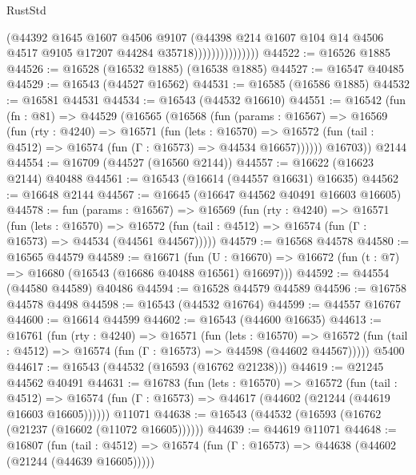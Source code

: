 \begin{lexlean}{RustStd}
\begin{coremodule}
                              (@44392
                                @1645
                                @1607
                                @4506
                                @9107
                                (@44398
                                  @214
                                  @1607
                                  @104
                                  @14
                                  @4506
                                  @4517
                                  @9105
                                  @17207
                                  @44284
                                  @35718)))))))))))))))
@44522 := @16526 @1885
@44526 := @16528 (@16532 @1885) (@16538 @1885)
@44527 := @16547 @40485
@44529 := @16543 (@44527 @16562)
@44531 := @16585 (@16586 @1885)
@44532 := @16581 @44531
@44534 := @16543 (@44532 @16610)
@44551 := @16542
    (fun (fn : @81) =>
    @44529
      (@16565
        (@16568
          (fun (params : @16567) =>
          @16569
            (fun (rty : @4240) =>
            @16571
              (fun (lets : @16570) =>
              @16572 (fun (tail : @4512) => @16574 (fun (Γ : @16573) => @44534 @16657))))))
        @16703))
    @2144
@44554 := @16709 (@44527 (@16560 @2144))
@44557 := @16622 (@16623 @2144) @40488
@44561 := @16543 (@16614 (@44557 @16631) @16635)
@44562 := @16648 @2144
@44567 := @16645 (@16647 @44562 @40491 @16603 @16605)
@44578 := fun (params : @16567) =>
  @16569
    (fun (rty : @4240) =>
    @16571
      (fun (lets : @16570) =>
      @16572 (fun (tail : @4512) => @16574 (fun (Γ : @16573) => @44534 (@44561 @44567)))))
@44579 := @16568 @44578
@44580 := @16565 @44579
@44589 := @16671
    (fun (U : @16670) => @16672 (fun (t : @7) => @16680 (@16543 (@16686 @40488 @16561) @16697)))
@44592 := @44554 (@44580 @44589) @40486
@44594 := @16528 @44579 @44589
@44596 := @16758 @44578 @4498
@44598 := @16543 (@44532 @16764)
@44599 := @44557 @16767
@44600 := @16614 @44599
@44602 := @16543 (@44600 @16635)
@44613 := @16761
    (fun (rty : @4240) =>
    @16571
      (fun (lets : @16570) =>
      @16572 (fun (tail : @4512) => @16574 (fun (Γ : @16573) => @44598 (@44602 @44567)))))
    @5400
@44617 := @16543 (@44532 (@16593 (@16762 @21238)))
@44619 := @21245 @44562 @40491
@44631 := @16783
    (fun (lets : @16570) =>
    @16572
      (fun (tail : @4512) =>
      @16574 (fun (Γ : @16573) => @44617 (@44602 (@21244 (@44619 @16603 @16605))))))
    @11071
@44638 := @16543 (@44532 (@16593 (@16762 (@21237 (@16602 (@11072 @16605))))))
@44639 := @44619 @11071
@44648 := @16807
    (fun (tail : @4512) => @16574 (fun (Γ : @16573) => @44638 (@44602 (@21244 (@44639 @16605)))))

\end{coremodule}
\end{lexlean}
